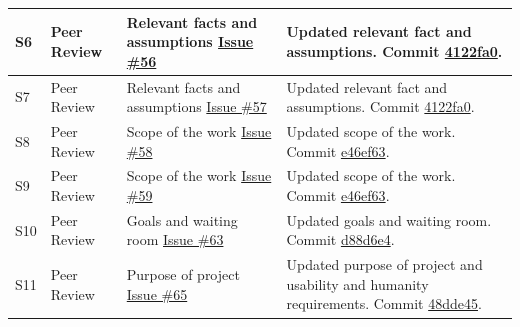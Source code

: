 \documentclass{article}
\begin{document}
\begin{longtable}{p{} p{} p{} p{}}
S6 & Peer Review & Relevant facts and assumptions \newline \href{https://github.com/The-Crazy-Four-Games/Crazy_1-0s_Game/issues/56}{Issue \#56} & Updated relevant fact and assumptions. \newline Commit \href{https://github.com/The-Crazy-Four-Games/Crazy_1-0s_Game/commit/4122fa03e0d6eefad59f18151967d7b257a9c236}{4122fa0}. \\
\midrule

S7 & Peer Review & Relevant facts and assumptions \newline \href{https://github.com/The-Crazy-Four-Games/Crazy_1-0s_Game/issues/57}{Issue \#57} & Updated relevant fact and assumptions. \newline Commit \href{https://github.com/The-Crazy-Four-Games/Crazy_1-0s_Game/commit/4122fa03e0d6eefad59f18151967d7b257a9c236}{4122fa0}. \\
\midrule

S8 & Peer Review & Scope of the work \newline \href{https://github.com/The-Crazy-Four-Games/Crazy_1-0s_Game/issues/58}{Issue \#58} & Updated scope of the work. \newline Commit \href{https://github.com/The-Crazy-Four-Games/Crazy_1-0s_Game/commit/e46ef632849df24c1ecac27e8ebe9482e0b40331}{e46ef63}. \\
\midrule

S9 & Peer Review & Scope of the work \newline \href{https://github.com/The-Crazy-Four-Games/Crazy_1-0s_Game/issues/59}{Issue \#59} & Updated scope of the work. \newline Commit \href{https://github.com/The-Crazy-Four-Games/Crazy_1-0s_Game/commit/e46ef632849df24c1ecac27e8ebe9482e0b40331}{e46ef63}. \\
\midrule

S10 & Peer Review & Goals and waiting room \newline \href{https://github.com/The-Crazy-Four-Games/Crazy_1-0s_Game/issues/63}{Issue \#63} & Updated goals and waiting room. \newline Commit \href{https://github.com/The-Crazy-Four-Games/Crazy_1-0s_Game/commit/d88d6e4aef7255a188b6b884f811788408ce652b}{d88d6e4}. \\
\midrule

S11 & Peer Review & Purpose of project \newline \href{https://github.com/The-Crazy-Four-Games/Crazy_1-0s_Game/issues/65}{Issue \#65} & Updated purpose of project and usability and humanity requirements. \newline Commit \href{https://github.com/The-Crazy-Four-Games/Crazy_1-0s_Game/commit/48dde45c8a39535165cfe323ac529d9719e2c5fe}{48dde45}. \\
\midrule


\end{longtable}
\end{document}
